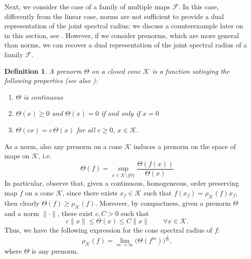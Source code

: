 \documentclass{article}
\newtheorem{definition}[theorem]{Definition}
\newcommand{\family}{\mathcal{F}}
\newcommand{\cradius}{\rho_{\cone}}
\newcommand{\cone}{\mathcal{K}}
\begin{document}
Next, we consider the case of a family of multiple maps $\family$. In this case, differently from the linear case, norms are not sufficient to provide a dual representation of the joint spectral radius; we discuss a counterexample later on in this section, see . However, if we consider prenorms, which are more general than norms, we can recover a dual representation of the joint spectral radius of a family $\family$. 
%
\begin{definition}\label{Def:prenorm}
A prenorm $\Theta$ on a closed cone $\cone$ is a function satisying the following properties (see also \cite{MERIKOSKI1991315}):
%
\begin{enumerate}
    \item $\Theta$ is continuous 
    \item $\Theta(x)\geq 0$ and $\Theta(x)=0$ if and only if $x=0$
    \item $\Theta(cx)=c\, \Theta(x)$ for all $c\geq 0$, $x\in \cone$.
\end{enumerate} 
\end{definition}
%
As a norm, also any prenorm on a cone $\cone$ induces a prenorm on the space of maps on $\cone$, i.e.
\begin{equation}
    \Theta(f)=\sup_{x\in \cone\setminus\{0\}} \frac{\Theta(f(x))}{\Theta(x)}
\end{equation}
%
In particular, observe that, given a continuous, homogeneous, order preserving map $f$ on a cone $\cone$, since there exists $x_f\in\cone$ such that $f(x_f)=\cradius(f) x_f$, then clearly $\Theta(f)\geq \cradius (f)$. 
%
Moreover, by compactness, given a prenorm $\Theta$ and a norm $\|\cdot\|$, there exist $c,C>0$ such that 
\begin{equation}
    c\|x\|\leq \Theta(x)\leq C\|x\| \qquad \forall x\in \cone.
\end{equation}
Thus, we have the following expression for the cone spectral radius of $f$:
\begin{equation}
    \cradius(f)=\lim_{m\rightarrow \infty}\big(\Theta(f^m)\big)^\frac{1}{m},
\end{equation}
where $\Theta$ is any prenorm. 
%
\end{document}
